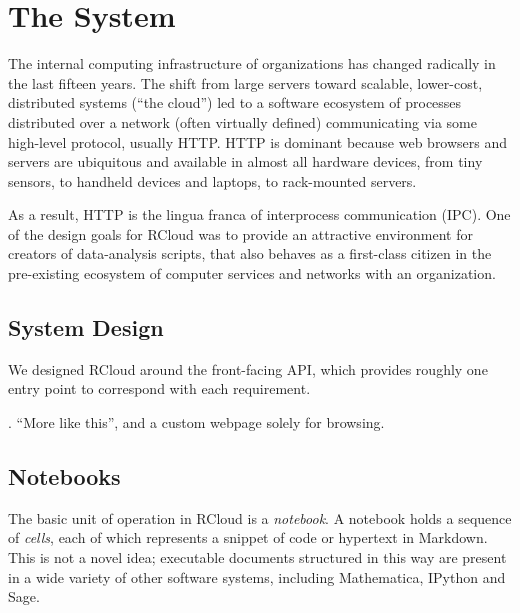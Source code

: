 \section{The System\label{sec:system}}


The internal computing infrastructure of organizations has changed
radically in the last fifteen years. The shift from large
servers toward scalable, lower-cost, distributed systems (``the cloud'')
led to a software ecosystem of processes distributed over a
network (often virtually defined) communicating via some
high-level protocol, usually HTTP.  HTTP is dominant because web
browsers and servers are ubiquitous and available in almost
all hardware devices, from tiny sensors, to handheld devices and
laptops, to rack-mounted servers.

As a result, HTTP is the lingua franca of interprocess communication
(IPC). One of the design goals for RCloud was to provide an attractive
environment for creators of data-analysis scripts, that also behaves
as a first-class citizen in the pre-existing ecosystem of computer
services and networks with an organization.


\subsection{System Design}

We designed RCloud around the front-facing API, which provides roughly
one entry point to correspond with each requirement.




. ``More like this'', and a custom webpage solely for browsing.

\subsection{Notebooks\label{sec:notebooks}}

The basic unit of operation in RCloud is a \emph{notebook}. A notebook
holds a sequence of \emph{cells}, each of which represents a
snippet of code or hypertext in Markdown. This is not a novel idea;
executable documents structured in this way are present in a wide
variety of other software systems, including Mathematica, IPython and Sage.

